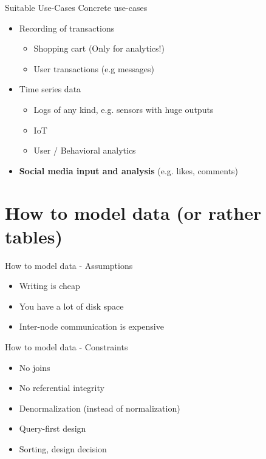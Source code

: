 \documentclass[
  10pt
]{beamer}
\begin{document}
\begin{frame}{Suitable Use-Cases \cite{suitableUseCases}}
  Concrete use-cases
  \begin{itemize}
    \item<1-> Recording of transactions
      \begin{itemize}
        \item Shopping cart (Only for analytics!)
        \item User transactions (e.g messages)
      \end{itemize}
    \item<2-> Time series data
      \begin{itemize}
        \item Logs of any kind, e.g. sensors with huge outputs
        \item IoT
        \item User / Behavioral analytics
      \end{itemize}
    \item<3-> \textbf{Social media input and analysis} (e.g. likes, comments)
  \end{itemize}


\end{frame}

\section{How to model data (or rather tables)}  %

\begin{frame}{How to model data - Assumptions \cite{hobbs_datamodeling, guru99_modeling}}
  \begin{itemize}
    \item Writing is cheap
    \item You have a lot of disk space
    \item Inter-node communication is expensive
  \end{itemize}
\end{frame}

\begin{frame}{How to model data - Constraints \cite{modelDataConstraints}}
  \begin{itemize}
    \item<+-> No joins
    \item<+-> No referential integrity
    \item<+-> Denormalization (instead of normalization)
    \item<+-> Query-first design
    \item<+-> Sorting, design decision
  \end{itemize}
\end{frame}
\end{document}
